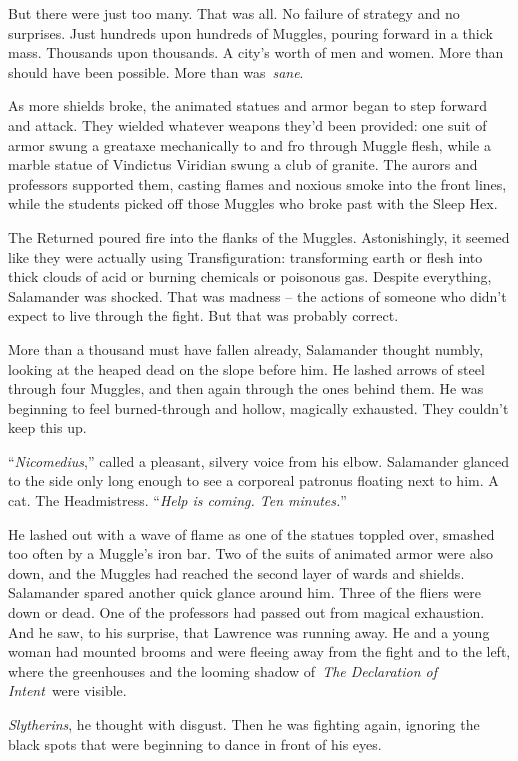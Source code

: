 But there were just too many. That was all. No failure of strategy and
no surprises. Just hundreds upon hundreds of Muggles, pouring forward in
a thick mass. Thousands upon thousands. A city's worth of men and women.
More than should have been possible. More than was~\emph{sane}.

As more shields broke, the animated statues and armor began to step
forward and attack. They wielded whatever weapons they'd been provided:
one suit of armor swung a greataxe mechanically to and fro through
Muggle flesh, while a marble statue of Vindictus Viridian swung a club
of granite. The aurors and professors supported them, casting flames and
noxious smoke into the front lines, while the students picked off those
Muggles who broke past with the Sleep Hex.

The Returned poured fire into the flanks of the Muggles. Astonishingly,
it seemed like they were actually using Transfiguration: transforming
earth or flesh into thick clouds of acid or burning chemicals or
poisonous gas. Despite everything, Salamander was shocked. That was
madness -- the actions of someone who didn't expect to live through the
fight. But that was probably correct.

More than a thousand must have fallen already, Salamander thought
numbly, looking at the heaped dead on the slope before him. He lashed
arrows of steel through four Muggles, and then again through the ones
behind them. He was beginning to feel burned-through and hollow,
magically exhausted. They couldn't keep this up.

``\emph{Nicomedius},'' called a pleasant, silvery voice from his elbow.
Salamander glanced to the side only long enough to see a corporeal
patronus floating next to him. A cat. The Headmistress. ``\emph{Help is
coming. Ten minutes.}''

He lashed out with a wave of flame as one of the statues toppled over,
smashed too often by a Muggle's iron bar. Two of the suits of animated
armor were also down, and the Muggles had reached the second layer of
wards and shields. Salamander spared another quick glance around him.
Three of the fliers were down or dead. One of the professors had passed
out from magical exhaustion. And he saw, to his surprise, that Lawrence
was running away. He and a young woman had mounted brooms and were
fleeing away from the fight and to the left, where the greenhouses and
the looming shadow of~\emph{The Declaration of Intent}~were visible.

\emph{Slytherins}, he thought with disgust. Then he was fighting again,
ignoring the black spots that were beginning to dance in front of his
eyes.


